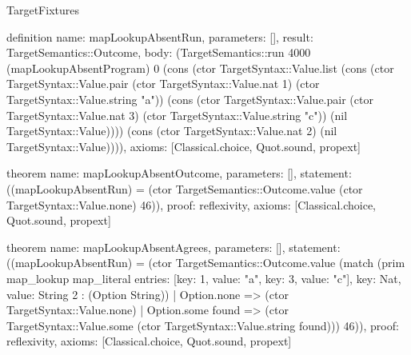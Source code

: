 \begin{lexlean}{TargetFixtures}
\begin{semanticmodule}
definition{
  name: mapLookupAbsentRun,
  parameters: [],
  result: TargetSemantics::Outcome,
  body: (TargetSemantics::run 4000 (mapLookupAbsentProgram) 0 (cons (ctor TargetSyntax::Value.list (cons (ctor TargetSyntax::Value.pair (ctor TargetSyntax::Value.nat 1) (ctor TargetSyntax::Value.string "a")) (cons (ctor TargetSyntax::Value.pair (ctor TargetSyntax::Value.nat 3) (ctor TargetSyntax::Value.string "c")) (nil TargetSyntax::Value)))) (cons (ctor TargetSyntax::Value.nat 2) (nil TargetSyntax::Value)))),
  axioms: [Classical.choice, Quot.sound, propext]
}

theorem{
  name: mapLookupAbsentOutcome,
  parameters: [],
  statement: ((mapLookupAbsentRun) = (ctor TargetSemantics::Outcome.value (ctor TargetSyntax::Value.none) 46)),
  proof: reflexivity{},
  axioms: [Classical.choice, Quot.sound, propext]
}

theorem{
  name: mapLookupAbsentAgrees,
  parameters: [],
  statement: ((mapLookupAbsentRun) = (ctor TargetSemantics::Outcome.value (match (prim map_lookup map_literal{
      entries: [{key: 1, value: "a"}, {key: 3, value: "c"}],
      key: Nat,
      value: String
    } 2 : (Option String))
    | Option.none => (ctor TargetSyntax::Value.none)
    | Option.some found => (ctor TargetSyntax::Value.some (ctor TargetSyntax::Value.string found))) 46)),
  proof: reflexivity{},
  axioms: [Classical.choice, Quot.sound, propext]
}


\end{semanticmodule}
\end{lexlean}
